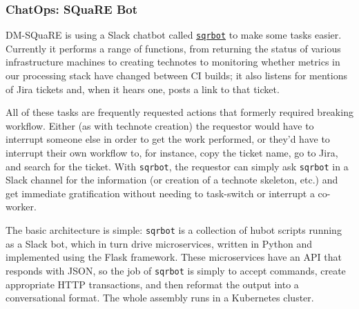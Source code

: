 \subsubsection{ChatOps: SQuaRE Bot}
\label{sec:chatops}

DM-SQuaRE is using a Slack chatbot called \href{https://github.com/lsst-sqre/sqrbot}{\texttt{sqrbot}} to make some tasks
easier. Currently it performs a range of functions, from returning the
status of various infrastructure machines to creating technotes to
monitoring whether metrics in our processing stack have changed between
CI builds; it also listens for mentions of Jira tickets and, when it
hears one, posts a link to that ticket.

All of these tasks are frequently requested actions that formerly
required breaking workflow.  Either (as with technote creation) the
requestor would have to interrupt someone else in order to get the work
performed, or they'd have to interrupt their own workflow to, for
instance, copy the ticket name, go to Jira, and search for the ticket.
With \texttt{sqrbot}, the requestor can simply ask \texttt{sqrbot} in a Slack channel for
the information (or creation of a technote skeleton, etc.) and get
immediate gratification without needing to task-switch or interrupt
a co-worker.

The basic architecture is simple: \texttt{sqrbot} is a collection of hubot
scripts running as a Slack bot, which in turn drive microservices,
written in Python and implemented using the Flask framework.  These
microservices have an API that responds with JSON, so the job of \texttt{sqrbot}
is simply to accept commands, create appropriate HTTP transactions, and
then reformat the output into a conversational format.  The whole
assembly runs in a Kubernetes cluster.
